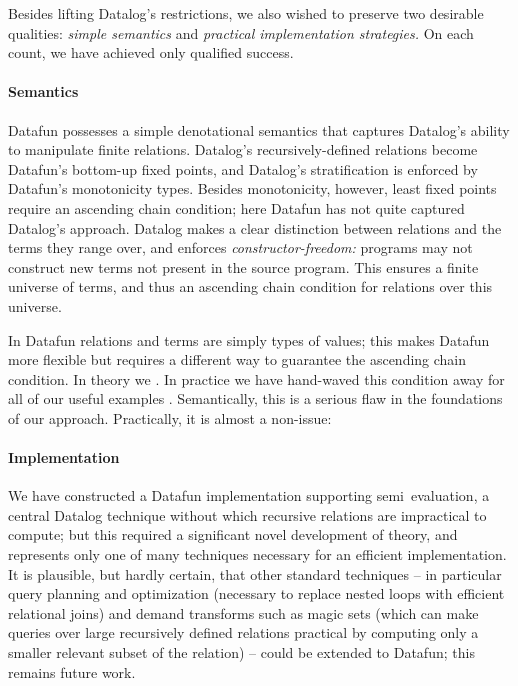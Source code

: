 Besides lifting Datalog's restrictions, we also wished to preserve two desirable
qualities: \emph{simple semantics} and \emph{practical implementation
strategies.} On each count, we have achieved only qualified success.

\paragraph{Semantics}

Datafun possesses a simple denotational semantics that captures Datalog's
ability to manipulate finite relations. Datalog's recursively-defined relations
become Datafun's bottom-up fixed points, and Datalog's stratification is
enforced by Datafun's monotonicity types.
%
Besides monotonicity, however, least fixed points require an ascending chain condition; here Datafun has not quite captured Datalog's approach.
%
Datalog makes a clear distinction between relations and the terms they range over, and enforces \emph{constructor-freedom:} programs may not construct new terms not present in the source program. This ensures a finite universe of terms, and thus an ascending chain condition for relations over this universe.

In Datafun relations and terms are simply types of values; this makes Datafun more flexible but requires a different way to guarantee the ascending chain condition.
%
In theory we \XXX.
%
In practice we have hand-waved this condition away for all of our useful examples .
%
Semantically, this is a serious flaw in the foundations of our approach.
%
Practically, it is almost a non-issue: \XXX


\paragraph{Implementation}

We have constructed a Datafun implementation supporting semi\naive\ evaluation,
a central Datalog technique without which recursive relations are impractical to
compute; but this required a significant novel development of theory, and
represents only one of many techniques necessary for an efficient
implementation. It is plausible, but hardly certain, that other standard
techniques -- in particular query planning and optimization (necessary to
replace nested loops with efficient relational joins) and demand transforms such
as magic sets (which can make queries over large recursively defined relations
practical by computing only a smaller relevant subset of the relation) -- could
be extended to Datafun; this remains future work.

